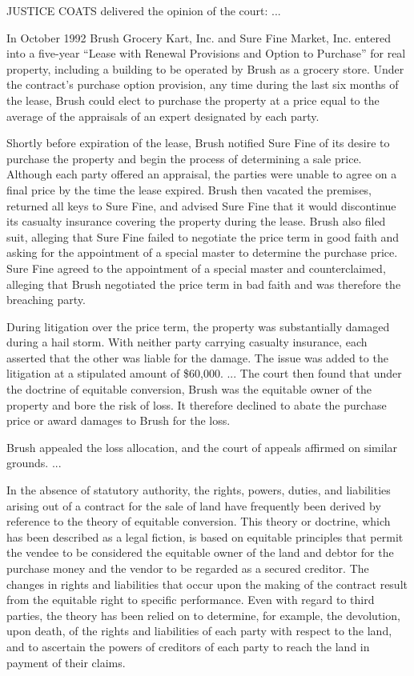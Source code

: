 
\textsc{JUSTICE COATS} delivered the opinion of the court: ... 

In October 1992 Brush Grocery Kart, Inc. and Sure Fine Market, Inc. entered into
a five-year ``Lease with Renewal Provisions and Option to Purchase'' for real
property, including a building to be operated by Brush as a grocery store.
Under the contract's purchase option provision, any time during the last six
months of the lease, Brush could elect to purchase the property at a price
equal to the average of the appraisals of an expert designated by each party. 

Shortly before expiration of the lease, Brush notified Sure Fine of its desire
to purchase the property and begin the process of determining a sale price.
Although each party offered an appraisal, the parties were unable to agree on a
final price by the time the lease expired. Brush then vacated the premises,
returned all keys to Sure Fine, and advised Sure Fine that it would discontinue
its casualty insurance covering the property during the lease. Brush also filed
suit, alleging that Sure Fine failed to negotiate the price term in good faith
and asking for the appointment of a special master to determine the purchase
price. Sure Fine agreed to the appointment of a special master and
counterclaimed, alleging that Brush negotiated the price term in bad faith and
was therefore the breaching party. 

During litigation over the price term, the property was substantially damaged
during a hail storm. With neither party carrying casualty insurance, each
asserted that the other was liable for the damage. The issue was added to the
litigation at a stipulated amount of \$60,000. ... The court then found that
under the doctrine of equitable conversion, Brush was the equitable owner of
the property and bore the risk of loss. It therefore declined to abate the
purchase price or award damages to Brush for the loss. 

Brush appealed the loss allocation, and the court of appeals affirmed on similar
grounds. ... 

In the absence of statutory authority, the rights, powers, duties, and
liabilities arising out of a contract for the sale of land have frequently been
derived by reference to the theory of equitable conversion. This theory or
doctrine, which has been described as a legal fiction, is based on equitable
principles that permit the vendee to be considered the equitable owner of the
land and debtor for the purchase money and the vendor to be regarded as a
secured creditor. The changes in rights and liabilities that occur upon the
making of the contract result from the equitable right to specific performance.
Even with regard to third parties, the theory has been relied on to determine,
for example, the devolution, upon death, of the rights and liabilities of each
party with respect to the land, and to ascertain the powers of creditors of
each party to reach the land in payment of their claims. 

